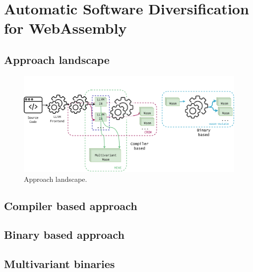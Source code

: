 \chapter{Automatic Software Diversification for WebAssembly}
\label{tech}


\section{Approach landscape}

\begin{figure}[h]
	\centering
	\includegraphics[width=1.0\textwidth]{figures/landscape.pdf}
	\caption{Approach landscape.}
	\label{fig:approach_landscape}
\end{figure}

\section{Compiler based approach}

\section{Binary based approach}


\section{Multivariant binaries}



